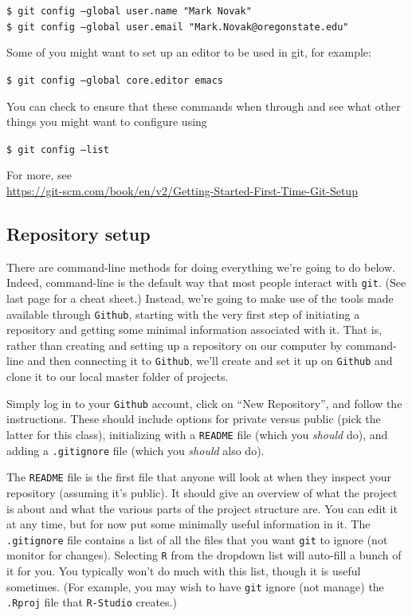 \documentclass[12pt,letterpaper]{article}
\begin{document}
     \texttt{\$ git config --global user.name "Mark Novak"}\\
     \texttt{\$ git config --global user.email "Mark.Novak@oregonstate.edu"}
       
Some of you might want to set up an editor to be used in git, for example:

	\texttt{\$ git config --global core.editor emacs}

You can check to ensure that these commands when through and see what other things you might want to configure using

	\texttt{\$ git config --list}


For more, see\\
\url{https://git-scm.com/book/en/v2/Getting-Started-First-Time-Git-Setup}


\subsection{Repository setup}
There are command-line methods for doing everything we're going to do below.  Indeed, command-line is the default way that most people interact with \texttt{git}. (See last page for a cheat sheet.)  Instead, we're going to make use of the tools made available through \texttt{Github}, starting with the very first step of initiating a repository and getting some minimal information associated with it.  That is, rather than creating and setting up a repository on our computer by command-line and then connecting it to \texttt{Github}, we'll create and set it up on \texttt{Github} and clone it to our local  master folder of projects.

Simply log in to your \texttt{Github} account, click on ``New Repository'', and follow the instructions.  These should include options for private versus public (pick the latter for this class), initializing with a \texttt{README} file (which you \emph{should} do), and adding a \texttt{.gitignore} file (which you \emph{should} also do).

The \texttt{README} file is the first file that anyone will look at when they inspect your repository (assuming it's public).  It should give an overview of what the project is about and what the various parts of the project structure are.  You can edit it at any time, but for now put some minimally useful information in it.   The \texttt{.gitignore} file contains a list of all the files that you want \texttt{git} to ignore (not monitor for changes).  Selecting \texttt{R} from the dropdown list will auto-fill a bunch of it for you.  You typically won't do much with this list, though it is useful sometimes.  (For example, you may wish to have \texttt{git} ignore (not manage) the \texttt{.Rproj} file that \texttt{R-Studio} creates.)
\end{document}
